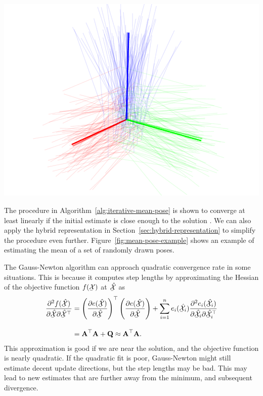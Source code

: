 \begin{example}[frametitle=Estimating the mean of a set of poses]
{
  \centering
  \includegraphics[width=0.75\columnwidth]{figures/mean-pose-example.pdf}
  \captionsetup{type=figure}
  \label{fig:mean-pose-example}
  \par
}
The procedure in Algorithm~\ref{alg:iterative-mean-pose} is shown to converge at least linearly if the initial estimate is close enough to the solution \cite{Arsigny2006Bi-invariant.}.
We can also apply the hybrid representation in Section~\ref{sec:hybrid-representation} to simplify the procedure even further.
Figure~\ref{fig:mean-pose-example} shows an example of estimating the mean of a set of randomly drawn poses.
\end{example}

The Gauss-Newton algorithm can approach quadratic convergence rate in some situations.
This is because it computes step lengths by approximating the Hessian of the objective function $f(\ubar{\cX})$ at $\ubar{\hat{\cX}}$ as
\begin{equation}
\begin{split}
  \frac{\partial^2 f(\ubar{\hat{\cX}})}{\partial \ubar{\hat{\cX}} \partial \ubar{\hat{\cX}}\trans} &= \left( \dpar{e(\ubar{\hat{\cX}})}{\ubar{\hat{\cX}}} \right)\trans \left( \dpar{e(\ubar{\hat{\cX}})}{\ubar{\hat{\cX}}} \right) +
  \sum_{i=1}^n e_i(\ubar{\hat{\cX}}_i) \frac{\partial^2 e_i(\ubar{\hat{\cX}}_i)}{\partial \ubar{\hat{\cX}}_i \partial \ubar{\hat{\cX}}_i\trans}\\[1em]
  &= \matA\trans \matA + \matQ \approx \matA\trans \matA.
\end{split}
\end{equation}
This approximation is good if we are near the solution, and the objective function is nearly quadratic.
If the quadratic fit is poor, Gauss-Newton might still estimate decent update directions, but the step lengths may be bad.
This may lead to new estimates that are further away from the minimum, and subsequent divergence.

